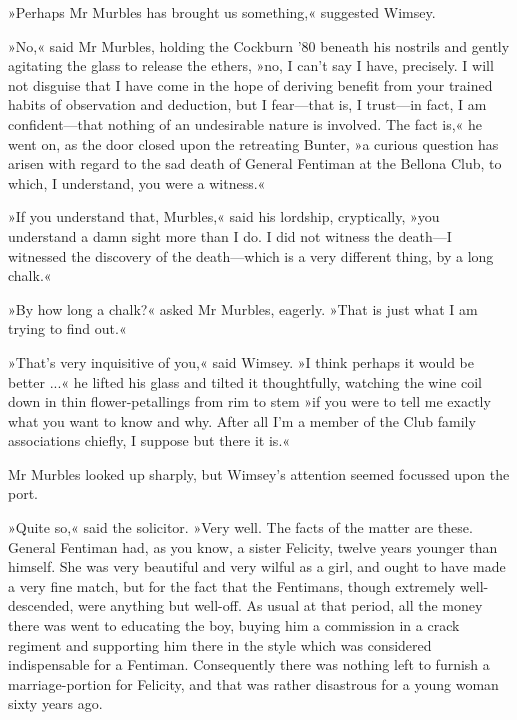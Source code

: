 »Perhaps Mr Murbles has brought us something,« suggested Wimsey.

»No,« said Mr Murbles, holding the Cockburn '80 beneath his nostrils and gently agitating the glass to release the ethers, »no, I can't say I have, precisely. I will not disguise that I have come in the hope of deriving benefit from your trained habits of observation and deduction, but I fear—that is, I trust—in fact, I am confident—that nothing of an undesirable nature is involved. The fact is,« he went on, as the door closed upon the retreating Bunter, »a curious question has arisen with regard to the sad death of General Fentiman at the Bellona Club, to which, I understand, you were a witness.«

»If you understand that, Murbles,« said his lordship, cryptically, »you understand a damn sight more than I do. I did not witness the death—I witnessed the discovery of the death—which is a very different thing, by a long chalk.«

»By how long a chalk?« asked Mr Murbles, eagerly. »That is just what I am trying to find out.«

»That's very inquisitive of you,« said Wimsey. »I think perhaps it would be better ...« he lifted his glass and tilted it thoughtfully, watching the wine coil down in thin flower-petallings from rim to stem \textellipsis  »if you were to tell me exactly what you want to know \textellipsis  and why. After all \textellipsis  I'm a member of the Club \textellipsis  family associations chiefly, I suppose \textellipsis  but there it is.«

Mr Murbles looked up sharply, but Wimsey's attention seemed focussed upon the port.

»Quite so,« said the solicitor. »Very well. The facts of the matter are these. General Fentiman had, as you know, a sister Felicity, twelve years younger than himself. She was very beautiful and very wilful as a girl, and ought to have made a very fine match, but for the fact that the Fentimans, though extremely well-descended, were anything but well-off. As usual at that period, all the money there was went to educating the boy, buying him a commission in a crack regiment and supporting him there in the style which was considered indispensable for a Fentiman. Consequently there was nothing left to furnish a marriage-portion for Felicity, and that was rather disastrous for a young woman sixty years ago.

